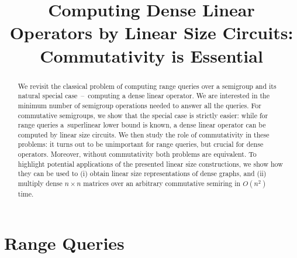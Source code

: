 \documentclass[11pt,letterpaper]{article}
\begin{document}
\listoftodos

\sloppy
\author{}
\title{Computing Dense Linear Operators by Linear Size Circuits: Commutativity is Essential}
\maketitle


\begin{abstract}


We revisit the classical problem of computing range queries over a semigroup and
its natural special case~--~computing a dense linear operator. We are interested
in the minimum number of semigroup operations needed to answer all the queries.
For commutative semigroups, we show that the special case is strictly easier:
while for range queries a~superlinear lower bound is known, a dense linear
operator can be computed by linear size circuits. We then study the role of
commutativity in these problems: it turns out to be unimportant for range
queries, but crucial for dense operators. Moreover, without commutativity both
problems are equivalent. To highlight potential applications of the presented
linear size constructions, we show how they can be used to (i) obtain linear
size representations of dense graphs, and (ii) multiply dense $n\times n$
matrices over an arbitrary commutative semiring in $O(n^2)$ time.
\end{abstract}


\section{Range Queries}
\end{document}

